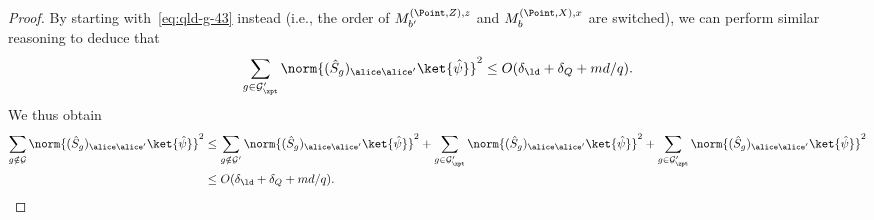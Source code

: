 \begin{proof}
	By starting with~\eqref{eq:qld-g-43} instead (i.e., the order of $M^{(\Point,Z),z}_{b'}$ and $M^{(\Point,X),x}_b$ are switched), we can perform similar reasoning to deduce that
	\begin{equation}
	\label{eq:qld-g-prime-zpt-bound}
		\sum_{g \in \mathcal{G}'_\xpt} \norm{ (\hat{S}_g)_{\alice \alice'} \ket{\hat{\psi}}}^2 \leq O(\delta_\ld + \delta_Q + md/q).
	\end{equation}	
	We thus obtain
	\begin{align}
		\sum_{g \notin \mathcal{G}} \norm{ (\hat{S}_g)_{\alice \alice'} \ket{\hat{\psi}}}^2 &\leq 
		\sum_{g \notin \mathcal{G}'}\norm{ (\hat{S}_g)_{\alice \alice'} \ket{\hat{\psi}}}^2 +  \sum_{g \in \mathcal{G}'_\xpt}\norm{ (\hat{S}_g)_{\alice \alice'} \ket{\hat{\psi}}}^2 + \sum_{g \in \mathcal{G}'_\zpt}\norm{ (\hat{S}_g)_{\alice \alice'} \ket{\hat{\psi}}}^2 \\
		&\leq O(\delta_\ld + \delta_Q + md/q). 
		\label{eq:qld-g-non-separable}
	\end{align}
        

\end{proof}
